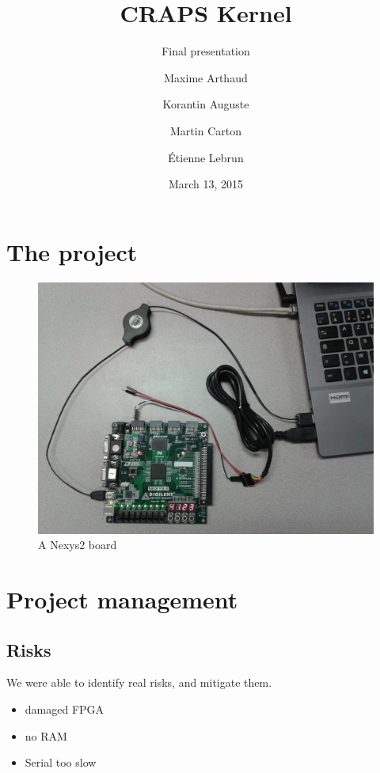 \documentclass{beamer}
\title{CRAPS Kernel}
\subtitle{Final presentation}
\author{
       Maxime Arthaud
  \and Korantin Auguste
  \and Martin Carton
  \and Étienne Lebrun
}
\date{March 13, 2015}
\begin{document}
  \begin{frame}
    \titlepage%
  \end{frame}

  \section{The project}

    \begin{frame}
      \begin{figure}
        \centering
        \includegraphics[width=\textwidth, keepaspectratio]{fig/Nexys2.jpg}
        \caption{A Nexys2 board}
      \end{figure}
    \end{frame}

  \section{Project management}

    \subsection{Risks}

    \begin{frame}
      We were able to identify real risks, and mitigate them.
      
      \begin{itemize}
        \item damaged FPGA
        \item no RAM
        \item Serial too slow
      \end{itemize}
    \end{frame}
\end{document}
